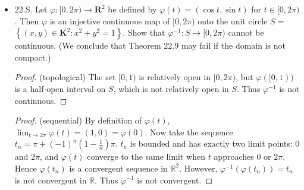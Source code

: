 \begin{itemize}
	\item 22.S. Let $\varphi:[0,2 \pi) \rightarrow \mathbf{R}^2$ be defined by $\varphi(t)=(\cos t, \sin t)$ for $t \in[0,2 \pi)$. Then $\varphi$ is an injective continuous map of $[0,2 \pi)$ onto the unit circle $S=$ $\left\{(x, y) \in \mathbf{K}^2: x^2+y^2=1\right\}$. Show that $\varphi^{-1}: S \rightarrow[0,2 \pi)$ cannot be continuous. (We conclude that Theorem $22.9$ may fail if the domain is not compact.)
\begin{proof}
	(topological)
	The set $[0,1)$ is relatively open in $[0,2 \pi)$, but $\varphi([0,1))$ is a half-open interval on $S$, which is not relatively open in $S$. Thus $\varphi^{-1}$ is not continuous.
\end{proof}
\begin{proof}
	(sequential)
	By definition of $\varphi(t)$, $\lim_{t \to  2 \pi} \varphi(t) = (1,0) = \varphi(0)$. Now take the sequence $t_n = \pi + (-1)^n\left( 1-\frac{1}{n} \right) \pi$. $t_n$ is bounded and has exactly two limit points: $0$ and $2 \pi$, and $\varphi(t)$ converge to the same limit when $t$ approaches $0$ or $2 \pi$. Hence $\varphi(t_n)$ is a convergent sequence in $\mathbb{R}^2$. However, $\varphi^{-1} (\varphi(t_n)) = t_n$ is not convergent in $\mathbb{R}$. Thus $\varphi^{-1} $ is not convergent.
\end{proof}


\end{itemize}
